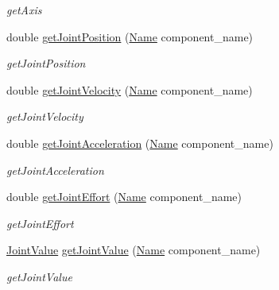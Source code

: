 \begin{DoxyCompactItemize}
\begin{DoxyCompactList}\small\item\em get\+Axis \end{DoxyCompactList}\item 
double \hyperlink{classrobotis__manipulator_1_1_manipulator_af7c65103032ba25d26dd77b49f7875ec}{get\+Joint\+Position} (\hyperlink{namespacerobotis__manipulator_a08c2d25e77a01ad75b9bb740f8ce4765}{Name} component\+\_\+name)
\begin{DoxyCompactList}\small\item\em get\+Joint\+Position \end{DoxyCompactList}\item 
double \hyperlink{classrobotis__manipulator_1_1_manipulator_a4588f79a86a8bc9505b257f8f4d9b1c4}{get\+Joint\+Velocity} (\hyperlink{namespacerobotis__manipulator_a08c2d25e77a01ad75b9bb740f8ce4765}{Name} component\+\_\+name)
\begin{DoxyCompactList}\small\item\em get\+Joint\+Velocity \end{DoxyCompactList}\item 
double \hyperlink{classrobotis__manipulator_1_1_manipulator_a473427796d0109cd5c093019e5286570}{get\+Joint\+Acceleration} (\hyperlink{namespacerobotis__manipulator_a08c2d25e77a01ad75b9bb740f8ce4765}{Name} component\+\_\+name)
\begin{DoxyCompactList}\small\item\em get\+Joint\+Acceleration \end{DoxyCompactList}\item 
double \hyperlink{classrobotis__manipulator_1_1_manipulator_ae592931354a1bb5f1ee1c14509bd1e5f}{get\+Joint\+Effort} (\hyperlink{namespacerobotis__manipulator_a08c2d25e77a01ad75b9bb740f8ce4765}{Name} component\+\_\+name)
\begin{DoxyCompactList}\small\item\em get\+Joint\+Effort \end{DoxyCompactList}\item 
\hyperlink{namespacerobotis__manipulator_aa0556c98c5294ccf3a96c2d0fe315e40}{Joint\+Value} \hyperlink{classrobotis__manipulator_1_1_manipulator_ad8709ca99c7a1ac09450fc8bca0ab7a5}{get\+Joint\+Value} (\hyperlink{namespacerobotis__manipulator_a08c2d25e77a01ad75b9bb740f8ce4765}{Name} component\+\_\+name)
\begin{DoxyCompactList}\small\item\em get\+Joint\+Value \end{DoxyCompactList}\item 

\end{DoxyCompactItemize}
